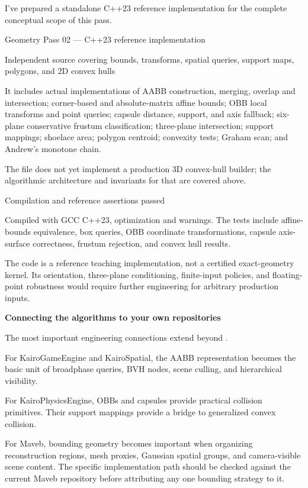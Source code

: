I've prepared a standalone C++23 reference implementation for the complete conceptual scope of this pass.

Geometry Pass 02 --- C++23 reference implementation

Independent source covering bounds, transforms, spatial queries, support maps, polygons, and 2D convex hulls

It includes actual implementations of AABB construction, merging, overlap and intersection; corner-based and absolute-matrix affine bounds; OBB local transforms and point queries; capsule distance, support, and axis fallback; six-plane conservative frustum classification; three-plane intersection; support mappings; shoelace area; polygon centroid; convexity tests; Graham scan; and Andrew's monotone chain.

The file does not yet implement a production 3D convex-hull builder; the algorithmic architecture and invariants for that are covered above.

Compilation and reference assertions passed

Compiled with GCC C++23, optimization and warnings. The tests include affine-bounds equivalence, box queries, OBB coordinate transformations, capsule axis-surface correctness, frustum rejection, and convex hull results.

The code is a reference teaching implementation, not a certified exact-geometry kernel. Its orientation, three-plane conditioning, finite-input policies, and floating-point robustness would require further engineering for arbitrary production inputs.

\textbf{Connecting the algorithms to your own repositories}

The most important engineering connections extend beyond .

For KairoGameEngine and KairoSpatial, the AABB representation becomes the basic unit of broadphase queries, BVH nodes, scene culling, and hierarchical visibility.

For KairoPhysicsEngine, OBBs and capsules provide practical collision primitives. Their support mappings provide a bridge to generalized convex collision.

For Maveb, bounding geometry becomes important when organizing reconstruction regions, mesh proxies, Gaussian spatial groups, and camera-visible scene content. The specific implementation path should be checked against the current Maveb repository before attributing any one bounding strategy to it.

